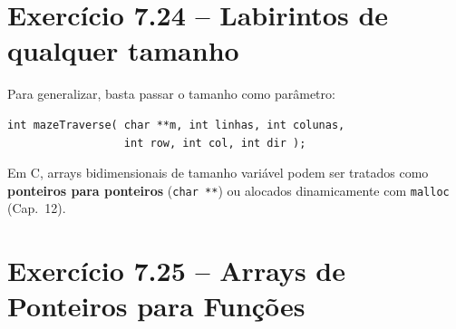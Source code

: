 \documentclass[12pt,a4paper]{article}
\begin{document}
\section{Exercício 7.24 -- Labirintos de qualquer tamanho}

\begin{respostabox}
Para generalizar, basta passar o tamanho como parâmetro:
\begin{lstlisting}
int mazeTraverse( char **m, int linhas, int colunas,
                  int row, int col, int dir );
\end{lstlisting}
Em C, arrays bidimensionais de tamanho variável podem ser tratados como
\textbf{ponteiros para ponteiros} (\texttt{char **}) ou alocados dinamicamente
com \texttt{malloc} (Cap.~12).
\end{respostabox}

\newpage

\section{Exercício 7.25 -- Arrays de Ponteiros para Funções}
\end{document}

